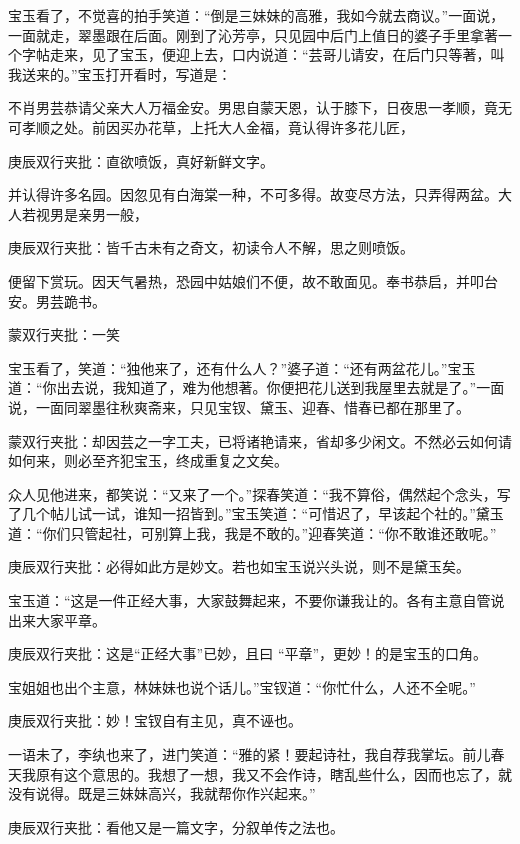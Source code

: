 \begin{parag}
    宝玉看了，不觉喜的拍手笑道：“倒是三妹妹的高雅，我如今就去商议。”一面说，一面就走，翠墨跟在后面。刚到了沁芳亭，只见园中后门上值日的婆子手里拿著一个字帖走来，见了宝玉，便迎上去，口内说道：“芸哥儿请安，在后门只等著，叫我送来的。”宝玉打开看时，写道是：
\end{parag}

\begin{qute2sp}
    不肖男芸恭请父亲大人万福金安。男思自蒙天恩，认于膝下，日夜思一孝顺，竟无可孝顺之处。前因买办花草，上托大人金福，竟认得许多花儿匠，\begin{note}庚辰双行夹批：直欲喷饭，真好新鲜文字。\end{note}并认得许多名园。因忽见有白海棠一种，不可多得。故变尽方法，只弄得两盆。大人若视男是亲男一般，\begin{note}庚辰双行夹批：皆千古未有之奇文，初读令人不解，思之则喷饭。\end{note}便留下赏玩。因天气暑热，恐园中姑娘们不便，故不敢面见。奉书恭启，并叩台安。男芸跪书。\begin{note}蒙双行夹批：一笑\end{note}
\end{qute2sp}

\begin{parag}
    宝玉看了，笑道：“独他来了，还有什么人？”婆子道：“还有两盆花儿。”宝玉道：“你出去说，我知道了，难为他想著。你便把花儿送到我屋里去就是了。”一面说，一面同翠墨往秋爽斋来，只见宝钗、黛玉、迎春、惜春已都在那里了。\begin{note}蒙双行夹批：却因芸之一字工夫，已将诸艳请来，省却多少闲文。不然必云如何请如何来，则必至齐犯宝玉，终成重复之文矣。\end{note}
\end{parag}


\begin{parag}
    众人见他进来，都笑说：“又来了一个。”探春笑道：“我不算俗，偶然起个念头，写了几个帖儿试一试，谁知一招皆到。”宝玉笑道：“可惜迟了，早该起个社的。”黛玉道：“你们只管起社，可别算上我，我是不敢的。”迎春笑道：“你不敢谁还敢呢。”\begin{note}庚辰双行夹批：必得如此方是妙文。若也如宝玉说兴头说，则不是黛玉矣。\end{note}宝玉道：“这是一件正经大事，大家鼓舞起来，不要你谦我让的。各有主意自管说出来大家平章。\begin{note}庚辰双行夹批：这是“正经大事”已妙，且曰 “平章”，更妙！的是宝玉的口角。\end{note}宝姐姐也出个主意，林妹妹也说个话儿。”宝钗道：“你忙什么，人还不全呢。”\begin{note}庚辰双行夹批：妙！宝钗自有主见，真不诬也。\end{note}一语未了，李纨也来了，进门笑道：“雅的紧！要起诗社，我自荐我掌坛。前儿春天我原有这个意思的。我想了一想，我又不会作诗，瞎乱些什么，因而也忘了，就没有说得。既是三妹妹高兴，我就帮你作兴起来。”\begin{note}庚辰双行夹批：看他又是一篇文字，分叙单传之法也。\end{note}
\end{parag}


